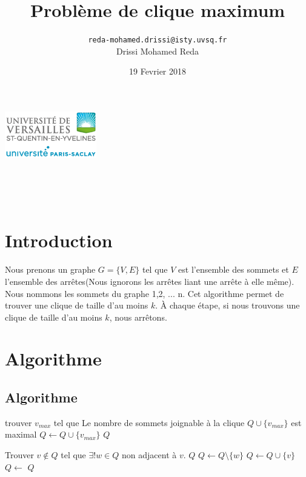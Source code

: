\documentclass{article}
\title{\Huge Problème de clique maximum}
\author{\texttt{reda-mohamed.drissi@isty.uvsq.fr}\\
        Drissi Mohamed Reda}
\date{19 Fevrier 2018}
\begin{document}
\makeatletter
    \begin{titlepage}
        \begin{center}
        	\includegraphics[width=40mm]{Report/uvsq-header.png}\par \vspace{1cm}
            {\@title }\\[4ex]
            {\@author}\\[4ex]
            {\@date} \\ [4ex]
        \end{center}
    \end{titlepage}
\makeatother
\thispagestyle{empty}
\newpage
\tableofcontents
\newpage
\section{Introduction}
Nous prenons un graphe $G=\{V,E\}$ tel que $V$ est l'ensemble des sommets
et $E$ l'ensemble des arrêtes(Nous ignorons les arrêtes liant une arrête à elle même). \\
Nous nommons les sommets du graphe 1,2, ... n. Cet algorithme permet de trouver une clique
de taille d'au moins $k$. À chaque étape, si nous trouvons une clique de taille d'au moins
$k$, nous arrêtons.
\section{Algorithme}
\subsection{Algorithme}
\begin{algorithm}
\begin{algorithmic}
    \State trouver $v_{max}$ tel que Le nombre de sommets joignable à la clique $Q \cup \{v_{max}\}$ est maximal
    \State $Q \gets Q\cup \{v_{max}\}$
  \EndWhile
    \State \Return $Q$
  \EndFunction
\end{algorithmic}
\end{algorithm}
\begin{algorithm}
\begin{algorithmic}
  \State Trouver $v \notin Q$ tel que $\exists! w \in Q$ non adjacent à $v$.
      \State \Return $Q$
    \Else
      \State $Q\gets Q \setminus \{w\}$
      \State $Q \gets Q \cup \{v\}$
      \State $Q \gets$ 
      \State \Return $Q$
    \EndIf
  \EndFunction
\end{algorithmic}
\end{algorithm}
\end{document}
